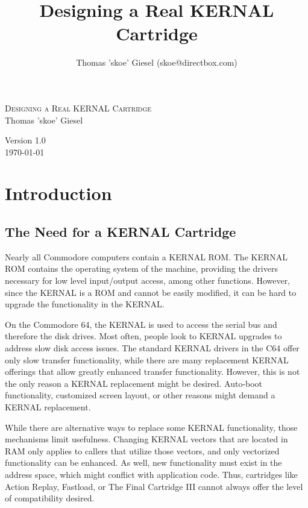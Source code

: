 \documentclass[a4paper,oneside]{memoir}
\title{Designing a Real KERNAL Cartridge}
\author{
Thomas 'skoe' Giesel
(skoe@directbox.com)
}
\begin{document}
\hsize

\pagestyle{empty}
\begin{center}

\vspace*{5cm}
\textsc{\huge Designing a Real KERNAL Cartridge}\\[2cm]
{\large Thomas 'skoe' Giesel}

\vfill

{\large Version 1.0 \\[0.5cm] \today}

\end{center}

\clearpage

\tableofcontents

\chapter{Introduction}

\section{The Need for a KERNAL Cartridge}

Nearly all Commodore computers contain a KERNAL ROM. The KERNAL ROM
contains the operating system of the machine, providing the drivers
necessary for low level input/output access, among other functions.
However, since the KERNAL is a ROM and cannot be easily modified, it
can be hard to upgrade the functionality in the KERNAL.

On the Commodore 64, the KERNAL is used to access the serial bus and
therefore the disk drives. Most often, people look to KERNAL
upgrades to address slow disk access issues. The standard KERNAL
drivers in the C64 offer only slow transfer functionality, while
there are many replacement KERNAL offerings that allow greatly
enhanced transfer functionality. However, this is not the only
reason a KERNAL replacement might be desired. Auto-boot
functionality, customized screen layout, or other reasons might
demand a KERNAL replacement.

While there are alternative ways to
replace some KERNAL functionality, those mechanisms limit
usefulness. Changing KERNAL vectors that are located in RAM only
applies to callers that utilize those vectors, and only vectorized
functionality can be enhanced. As well, new functionality must
exist in the address space, which might conflict with application
code. Thus, cartridges like Action Replay, Fastload, or The Final
Cartridge III cannot always offer the level of compatibility
desired.
\end{document}
